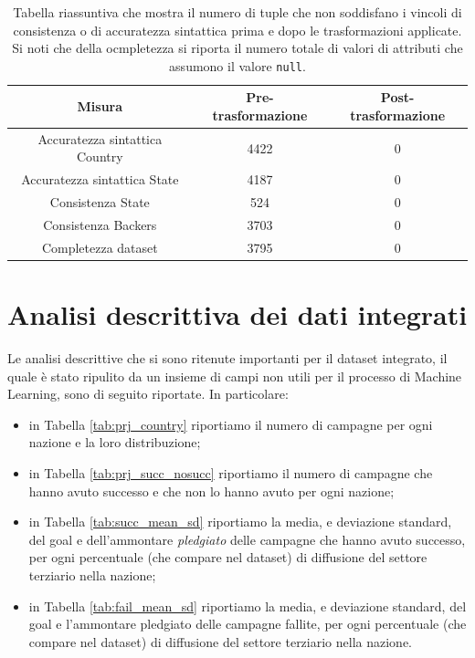 	\begin{table}
		\caption{Tabella riassuntiva che mostra il numero di tuple che non soddisfano i vincoli di consistenza o di accuratezza sintattica prima e dopo le trasformazioni applicate. Si noti che della ocmpletezza si riporta il numero totale di valori di attributi che assumono il valore \texttt{null}.}
	
		\label{tab:recap}
	
		\centering
	\begin{tabular}{|c|c|c|}
		\hline 
		\textbf{Misura} & \textbf{Pre-trasformazione} & \textbf{Post-trasformazione} \\ 
		\hline 
		Accuratezza sintattica Country & 4422 & 0 \\ 
		\hline
		Accuratezza sintattica State & 4187 & 0 \\ 
		\hline 	
		Consistenza State & 524 & 0 \\ 
		\hline 
		Consistenza Backers & 3703 & 0 \\ 
		\hline 
		Completezza dataset & 3795 & 0 \\ 
		\hline 
	\end{tabular} 
\end{table}
\newpage
\section{Analisi descrittiva dei dati integrati}
Le analisi descrittive che si sono ritenute importanti per il dataset integrato, il quale è stato ripulito da un insieme di campi non utili per il processo di Machine Learning, sono di seguito riportate.
In particolare:
\begin{itemize}
	\item in Tabella \ref{tab:prj_country} riportiamo il numero di campagne per ogni nazione e la loro distribuzione;
	\item in Tabella \ref{tab:prj_succ_nosucc} riportiamo il numero di campagne che hanno avuto successo e che non lo hanno avuto per ogni nazione;
	\item in Tabella \ref{tab:succ_mean_sd} riportiamo la media, e deviazione standard, del goal e dell'ammontare \textit{pledgiato} delle campagne che hanno avuto successo, per ogni percentuale (che compare nel dataset) di diffusione del settore terziario nella nazione; 
	\item in Tabella \ref{tab:fail_mean_sd} riportiamo la media, e deviazione standard, del goal e l'ammontare pledgiato delle campagne fallite, per ogni percentuale (che compare nel dataset) di diffusione del settore terziario nella nazione.
\end{itemize} 

